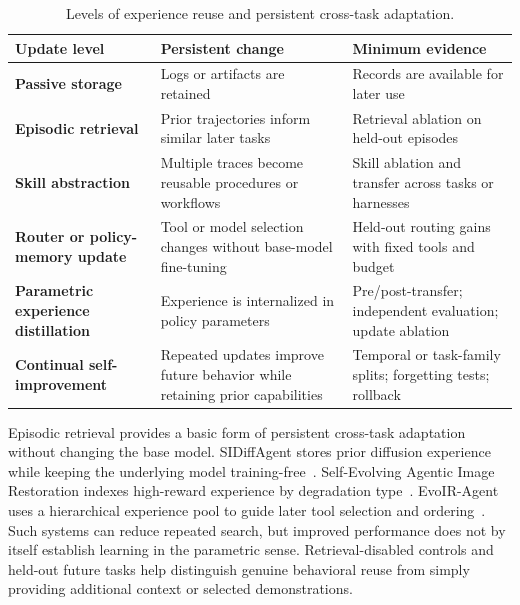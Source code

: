 \begin{table}[t]
  \caption{Levels of experience reuse and persistent cross-task adaptation.}
  \label{tab:experience-reuse}
  \small
  \setlength{\tabcolsep}{5pt}
  \renewcommand{\arraystretch}{1.08}
  \renewcommand{\tabularxcolumn}[1]{m{#1}}
  \begin{tabularx}{\textwidth}{@{}
    >{\raggedright\arraybackslash\bfseries}m{}
    >{\raggedright\arraybackslash}m{}
    >{\raggedright\arraybackslash}X@{}}
    \toprule
    Update level & \textbf{Persistent change} & \textbf{Minimum evidence} \\
    \midrule
    Passive storage & Logs or artifacts are retained & Records are available for later use \\
    \midrule
    Episodic retrieval & Prior trajectories inform similar later tasks & Retrieval ablation on held-out episodes \\
    \midrule
    Skill abstraction & Multiple traces become reusable procedures or workflows & Skill ablation and transfer across tasks or harnesses \\
    \midrule
    Router or policy-memory update & Tool or model selection changes without base-model fine-tuning & Held-out routing gains with fixed tools and budget \\
    \midrule
    Parametric experience distillation & Experience is internalized in policy parameters & Pre/post-transfer; independent evaluation; update ablation \\
    \midrule
    Continual self-improvement & Repeated updates improve future behavior while retaining prior capabilities & Temporal or task-family splits; forgetting tests; rollback \\
    \bottomrule
  \end{tabularx}
\end{table}
\FloatBarrier

Episodic retrieval provides a basic form of persistent cross-task adaptation without changing the base model. SIDiffAgent stores prior diffusion experience while keeping the underlying model training-free~\cite{avg260202051}. Self-Evolving Agentic Image Restoration indexes high-reward experience by degradation type~\cite{avg260628971}. EvoIR-Agent uses a hierarchical experience pool to guide later tool selection and ordering~\cite{avg260522208}. Such systems can reduce repeated search, but improved performance does not by itself establish learning in the parametric sense. Retrieval-disabled controls and held-out future tasks help distinguish genuine behavioral reuse from simply providing additional context or selected demonstrations.

